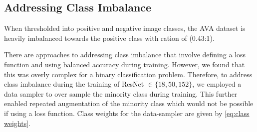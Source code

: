 \subsection{Addressing Class Imbalance}

When thresholded into positive and negative image classes, the AVA dataset is heavily imbalanced towards the positive class with ration of (0.43:1). 

There are approaches to addressing class imbalance that involve defining a loss function and using balanced accuracy during training. However, we found that this was overly complex for a binary classification problem. Therefore, to address class imbalance during the training of ResNet $\in \{18,50,152\}$, we employed a data sampler to over sample the minority class during training. This further enabled repeated augmentation of the minority class which would not be possible if using a loss function. Class weights for the data-sampler are given by \ref{eq:class weights}.

